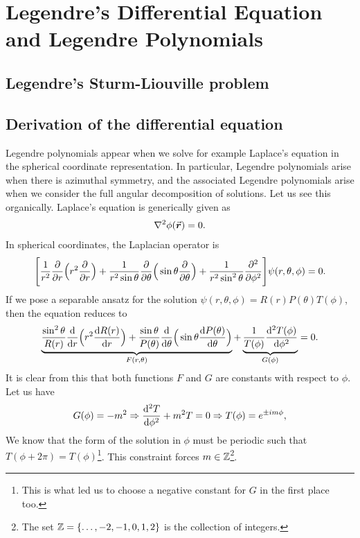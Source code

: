 \chapter{Legendre's Differential Equation and Legendre Polynomials}


\section{Legendre's Sturm-Liouville problem}

\section{Derivation of the differential equation}

Legendre polynomials appear when we solve for example Laplace's equation in the spherical coordinate representation.
In particular, Legendre polynomials arise when there is azimuthal symmetry, and the associated Legendre polynomials arise when we consider the full angular decomposition of solutions.
Let us see this organically.
Laplace's equation is generically given as
\begin{eqnarray}
    \laplacian \phi(\va*{r}) = 0
.\end{eqnarray}
In spherical coordinates, the Laplacian operator is
\begin{eqnarray}
    \Bigg[ \frac{1}{r^2} \pdv{r} \Big( r^2 \pdv{r} \Big) + \frac{1}{r^2 \sin{\theta}} \pdv{\theta} \Big( \sin{\theta} \pdv{\theta} \Big) + \frac{1}{r^2 \sin^2{\theta}} \pdv[2]{\phi} \Bigg] \psi(r,\theta,\phi) = 0
.\end{eqnarray}
If we pose a separable ansatz for the solution $\psi(r,\theta,\phi) = R(r) P(\theta) T(\phi)$, then the equation reduces to
\begin{align}
    \underbrace{ \frac{\sin^2{\theta}}{ R(r)} \dv{r} \Big( r^2 \dv{R(r)}{r} \Big) + \frac{\sin{\theta}}{P(\theta)} \dv{\theta} \Big( \sin{\theta} \dv{P(\theta)}{\theta} \Big) }_{F(r,\theta)} + \underbrace{ \frac{1}{T(\phi)} \dv[2]{T(\phi)}{\phi} }_{G(\phi)} = 0
.\end{align}
It is clear from this that both functions $F$ and $G$ are constants with respect to $\phi$.
Let us have 
\begin{align}
    G(\phi) = -m^2 \Rightarrow \dv[2]{T}{\phi} + m^2 T = 0 \Rightarrow T(\phi) = e^{\pm im\phi}
,\end{align}
We know that the form of the solution in $\phi$ must be periodic such that $T(\phi + 2\pi) = T(\phi)$\footnote{This is what led us to choose a negative constant for $G$ in the first place too.}.
This constraint forces $m \in \mathbb{Z}$\footnote{The set $\mathbb{Z} = \{ \ldots,-2,-1,0,1,2 \}$ is the collection of integers.}.

